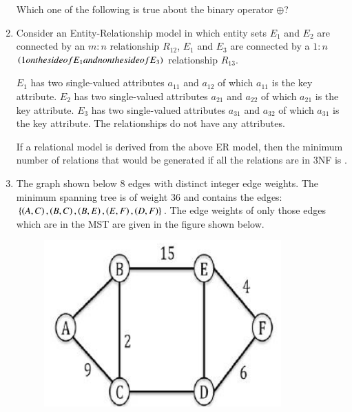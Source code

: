 \documentclass[journal,12pt,onecolumn]{IEEEtran}
\theoremstyle{remark}
\begin{document}
\begin{enumerate}[resume]
		Which one of the following is true about the binary operator $\oplus$?
		
		\hfill{}
		
		\begin{enumerate}
		\end{enumerate}
		
		\item Consider an Entity-Relationship  model in which entity sets $E_1$ and $E_2$ are connected by an $m:n$ relationship $R_{12}$, $E_1$ and $E_3$ are connected by a $1 \colon n$ $\left(1 on the side of E_1 and n on the side of E_3\right)$ relationship $R_{13}$.
		
		$E_1$ has two single-valued attributes $a_{11}$ and $a_{12}$ of which $a_{11}$ is the key attribute. $E_2$ has two single-valued attributes $a_{21}$ and $a_{22}$ of which $a_{21}$ is the key attribute. $E_3$ has two single-valued attributes $a_{31}$ and $a_{32}$ of which $a_{31}$ is the key attribute. The relationships do not have any attributes.
		
		If a relational model is derived from the above ER model, then the minimum number of relations that would be generated if all the relations are in 3NF is \underline{\hspace{2cm}}.
		
		\hfill{}
		
		\item The graph shown below $8$ edges with distinct integer edge weights. The minimum spanning tree  is of weight $36$ and contains the edges: $\{\left(A, C\right), \left(B, C\right), \left(B, E\right), \left(E, F\right), \left(D, F\right)\}$. The edge weights of only those edges which are in the MST are given in the figure shown below.
		
	\begin{figure}[H]
		\centering
		\includegraphics[width=0.3\linewidth]{figs/screenshot005}
		\caption{}
		\label{fig:screenshot005}
	\end{figure}
	

\end{enumerate}
\end{document}
